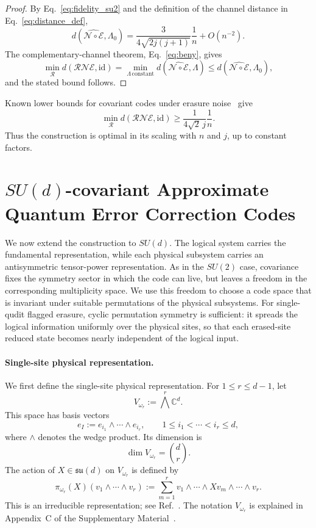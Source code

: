\documentclass[10pt,twocolumn,superscriptaddress,aps,amsmath,amssymb,citeautoscript,floatfix,prx,longbibliography]{revtex4-2}
\theoremstyle{plain}
\theoremstyle{plain}
\theoremstyle{plain}
\theoremstyle{plain}
\theoremstyle{plain}
\theoremstyle{plain}
\begin{document}
\begin{proof}
By Eq.~\eqref{eq:fidelity_su2} and the definition of the channel distance in Eq.~\eqref{eq:distance_def},
\[
    d\!\left(\widehat{\mathcal N\circ\mathcal E},\Lambda_0\right)
    =
    \frac{3}{4\sqrt{2j(j+1)}}\frac{1}{n}
    +O(n^{-2}) .
\]
The complementary-channel theorem, Eq.~\eqref{eq:beny}, gives
\[
    \min_{\mathcal R}
    d(\mathcal R\mathcal N\mathcal E,\mathrm{id})
    =
    \min_{\Lambda\,\mathrm{constant}}
    d\!\left(\widehat{\mathcal N\circ\mathcal E},\Lambda\right)
    \le
    d\!\left(\widehat{\mathcal N\circ\mathcal E},\Lambda_0\right),
\]
and the stated bound follows.
\end{proof}

Known lower bounds for covariant codes under erasure noise~\cite{Faist2020} give
\[
    \min_{\mathcal R}
    d(\mathcal R\mathcal N\mathcal E,\mathrm{id})
    \ge
    \frac{1}{4\sqrt{2}\,j}\frac{1}{n} .
\]
Thus the construction is optimal in its scaling with $n$ and $j$, up to constant factors.


\section{\texorpdfstring{$SU(d)$}{SU(d)}-covariant Approximate Quantum Error Correction Codes}\label{sec:main_sud}

We now extend the construction to $SU(d)$. The logical system carries the fundamental representation, while each physical subsystem carries an antisymmetric tensor-power representation. As in the $SU(2)$ case, covariance fixes the symmetry sector in which the code can live, but leaves a freedom in the corresponding multiplicity space. We use this freedom to choose a code space that is invariant under suitable permutations of the physical subsystems. For single-qudit flagged erasure, cyclic permutation symmetry is sufficient: it spreads the logical information uniformly over the physical sites, so that each erased-site reduced state becomes nearly independent of the logical input.

\paragraph{Single-site physical representation.}

We first define the single-site physical representation. For $1\le r\le d-1$, let
\begin{equation}\label{eq:vomegar_def}
V_{\omega_r}:=\bigwedge^r \mathbb C^d .
\end{equation}
This space has basis vectors
$$
e_I:=e_{i_1}\wedge\cdots\wedge e_{i_r},
\qquad
1\le i_1<\cdots<i_r\le d,
$$
where $\wedge$ denotes the wedge product. Its dimension is
$$
\dim V_{\omega_r}=\binom{d}{r}.
$$
The action of $X\in\mathfrak{su}(d)$ on $V_{\omega_r}$ is defined by
\begin{equation}\label{eq:sud_vomegar_def}
\pi_{\omega_r}(X)
\left(v_1\wedge\cdots\wedge v_r\right)
:=
\sum_{m=1}^r
v_1\wedge\cdots\wedge Xv_m\wedge\cdots\wedge v_r .
\end{equation}
This is an irreducible representation; see Ref.~\cite{FultonHarris1991}. The notation $V_{\omega_r}$ is explained in Appendix~C of the Supplementary Material~\cite{SuppMat}.
\end{document}
